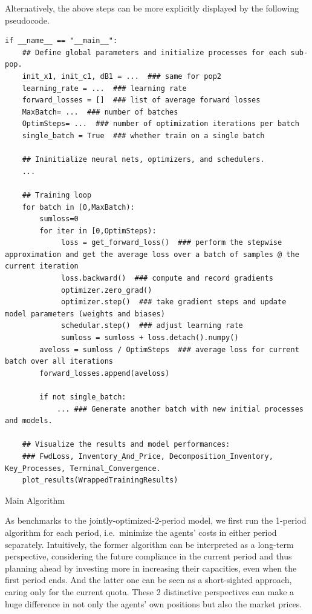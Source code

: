 \documentclass[a4paper,10pt]{article}
\newcommand{\1}{\mathbf{1}}
\begin{document}
Alternatively, the above steps can be more explicitly displayed by the following pseudocode.

\begin{algorithm}[ht]
\begin{verbatim}
if __name__ == "__main__":
    ## Define global parameters and initialize processes for each sub-pop. 
    init_x1, init_c1, dB1 = ...  ### same for pop2
    learning_rate = ...  ### learning rate
    forward_losses = []  ### list of average forward losses
    MaxBatch= ...  ### number of batches
    OptimSteps= ...  ### number of optimization iterations per batch
    single_batch = True  ### whether train on a single batch 

    ## Ininitialize neural nets, optimizers, and schedulers.
    ...

    ## Training loop
    for batch in [0,MaxBatch):
        sumloss=0
        for iter in [0,OptimSteps):
             loss = get_forward_loss()  ### perform the stepwise approximation and get the average loss over a batch of samples @ the current iteration
             loss.backward()  ### compute and record gradients
             optimizer.zero_grad()  
             optimizer.step()  ### take gradient steps and update model parameters (weights and biases)
             schedular.step()  ### adjust learning rate
             sumloss = sumloss + loss.detach().numpy() 
        aveloss = sumloss / OptimSteps  ### average loss for current batch over all iterations
        forward_losses.append(aveloss)
    
        if not single_batch:
            ... ### Generate another batch with new initial processes and models. 
    
    ## Visualize the results and model performances:
    ### FwdLoss, Inventory_And_Price, Decomposition_Inventory, Key_Processes, Terminal_Convergence.
    plot_results(WrappedTrainingResults)
\end{verbatim}
\caption{Main Algorithm}\label{alg:main-alg}
\end{algorithm}


As benchmarks to the jointly-optimized-2-period model, we first run the 1-period
algorithm for each period, i.e.~minimize the agents' costs in either
period separately. Intuitively, the former algorithm can be interpreted
as a long-term perspective, considering the future compliance in the
current period and thus planning ahead by investing more in increasing
their capacities, even when the first period ends. And the latter one
can be seen as a short-sighted approach, caring only for the current
quota. These 2 distinctive perspectives can make a huge difference in
not only the agents' own positions but also the market prices.
\end{document}
